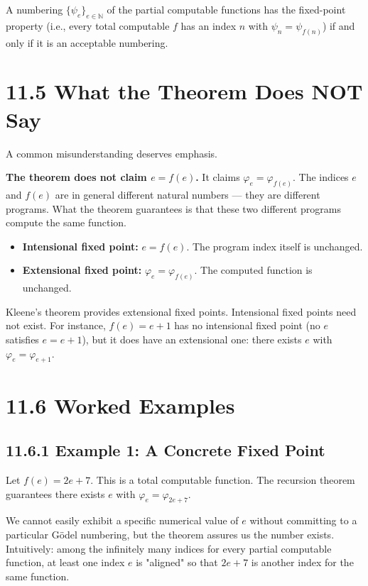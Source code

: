 \begin{theorem}
A numbering $\{ \psi_e\} _{e \in \mathbb{N}}$ of the partial computable functions has the fixed-point property (i.e., every total computable $f$ has an index $n$ with $\psi_n = \psi_{f(n)}$) if and only if it is an acceptable numbering.
\end{theorem}

\section{11.5 What the Theorem Does NOT Say}

A common misunderstanding deserves emphasis.

\textbf{The theorem does not claim $e = f(e)$.} It claims $\varphi_e = \varphi_{f(e)}$. The indices $e$ and $f(e)$ are in general different natural numbers --- they are different programs. What the theorem guarantees is that these two different programs compute the same function.

\begin{itemize}
  \item \textbf{Intensional fixed point:} $e = f(e)$. The program index itself is unchanged.
  \item \textbf{Extensional fixed point:} $\varphi_e = \varphi_{f(e)}$. The computed function is unchanged.
\end{itemize}

Kleene's theorem provides extensional fixed points. Intensional fixed points need not exist. For instance, $f(e) = e + 1$ has no intensional fixed point (no $e$ satisfies $e = e + 1$), but it does have an extensional one: there exists $e$ with $\varphi_e = \varphi_{e+1}$.

\section{11.6 Worked Examples}

\subsection{11.6.1 Example 1: A Concrete Fixed Point}

Let $f(e) = 2e + 7$. This is a total computable function. The recursion theorem guarantees there exists $e$ with $\varphi_e = \varphi_{2e+7}$.

We cannot easily exhibit a specific numerical value of $e$ without committing to a particular Gödel numbering, but the theorem assures us the number exists. Intuitively: among the infinitely many indices for every partial computable function, at least one index $e$ is "aligned" so that $2e + 7$ is another index for the same function.

